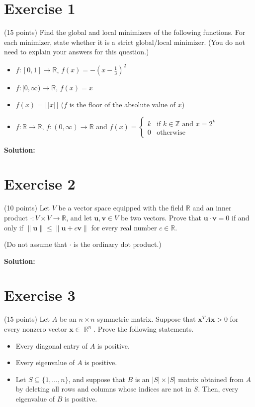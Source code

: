\documentclass{article}
\DeclareMathOperator{\R}{\mathbb R}
\begin{document}
\section*{Exercise 1}
(15 points) Find the global and local minimizers of the following functions. For each minimizer, state whether it is a strict global/local minimizer. (You do not need to explain your answers for this question.)

\begin{itemize}
    \item $f: [0,1] \to \mathbb{R}$, $f(x) = -(x-\frac{1}{3})^2$
    \item $f: [0,\infty) \to \mathbb{R}$, $f(x) = x$
    \item $f(x) = \lfloor|x|\rfloor$ ($f$ is the floor of the absolute value of $x$)
    \item $f: \mathbb{R} \to \mathbb{R}$, $f: (0,\infty) \to \mathbb{R}$ and $f(x) = \begin{cases} 
        k & \text{if } k \in \mathbb{Z} \text{ and } x = 2^k \\
        0 & \text{otherwise}
    \end{cases}$
\end{itemize}

\textbf{Solution:}

\newpage

\section*{Exercise 2}
(10 points) Let $V$ be a vector space equipped with the field $\mathbb{R}$ and an inner product $\cdot: V \times V \to \mathbb{R}$, and let $\mathbf{u}, \mathbf{v} \in V$ be two vectors. Prove that $\mathbf{u} \cdot \mathbf{v} = 0$ if and only if $\|\mathbf{u}\| \leq \|\mathbf{u} + c\mathbf{v}\|$ for every real number $c \in \mathbb{R}$.

(Do not assume that $\cdot$ is the ordinary dot product.)

\textbf{Solution:}

\newpage

\section*{Exercise 3}
(15 points) Let $A$ be an $n \times n$ symmetric matrix. Suppose that $\mathbf{x}^T A\mathbf{x} > 0$ for every nonzero vector $\mathbf{x} \in \R^n$. Prove the following statements.
\begin{itemize}
    \item Every diagonal entry of $A$ is positive.
    \item Every eigenvalue of $A$ is positive.
    \item Let $S \subseteq \{1,\ldots,n\}$, and suppose that $B$ is an $|S| \times |S|$ matrix obtained from $A$ by deleting all rows and columns whose indices are not in $S$. Then, every eigenvalue of $B$ is positive.
\end{itemize}
\end{document}
